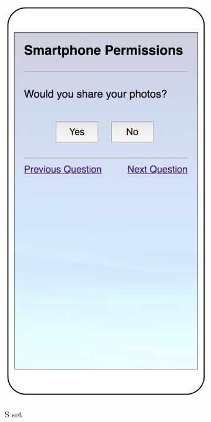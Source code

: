 \begin{figure}
	\begin{subfigure}[b]{0.24\textheight}
		\includegraphics[width=0.24\textheight]{figures/direct3.png}
		\label{fig:directc}
		\caption{S set}
	\end{subfigure}
	\begin{subfigure}[b]{0.24\textheight}

\end{subfigure}
\end{figure}
